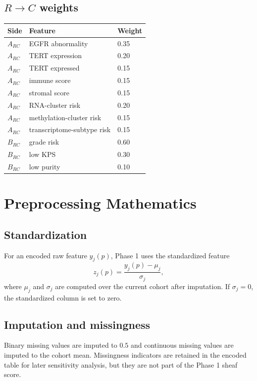 \documentclass[11pt]{article}
\begin{document}
\subsection{$R\to C$ weights}

\begin{longtable}{@{}lll@{}}
\toprule
Side & Feature & Weight\\
\midrule
\endhead
$A_{RC}$ & EGFR abnormality & 0.35\\
$A_{RC}$ & TERT expression & 0.20\\
$A_{RC}$ & TERT expressed & 0.15\\
$A_{RC}$ & immune score & 0.15\\
$A_{RC}$ & stromal score & 0.15\\
$A_{RC}$ & RNA-cluster risk & 0.20\\
$A_{RC}$ & methylation-cluster risk & 0.15\\
$A_{RC}$ & transcriptome-subtype risk & 0.15\\
\midrule
$B_{RC}$ & grade risk & 0.60\\
$B_{RC}$ & low KPS & 0.30\\
$B_{RC}$ & low purity & 0.10\\
\bottomrule
\end{longtable}

\section{Preprocessing Mathematics}

\subsection{Standardization}

For an encoded raw feature $y_j(p)$, Phase 1 uses the standardized feature
\[
z_j(p)=\frac{y_j(p)-\mu_j}{\sigma_j},
\]
where $\mu_j$ and $\sigma_j$ are computed over the current cohort after imputation.  If $\sigma_j=0$, the standardized column is set to zero.

\subsection{Imputation and missingness}

Binary missing values are imputed to $0.5$ and continuous missing values are imputed to the cohort mean.  Missingness indicators are retained in the encoded table for later sensitivity analysis, but they are not part of the Phase 1 sheaf score.
\end{document}
